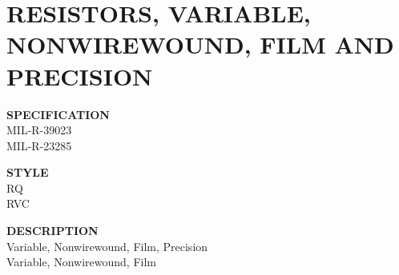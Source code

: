 \section{RESISTORS, VARIABLE, NONWIREWOUND, FILM AND PRECISION}

\begin{minipage}[t]{0.24\textwidth}
    \textbf{SPECIFICATION}\\
    MIL-R-39023\\MIL-R-23285
\end{minipage}
\hfill
\begin{minipage}[t]{0.12\textwidth}
    \textbf{STYLE}\\
    RQ\\RVC
\end{minipage}
\hfill
\begin{minipage}[t]{0.61\textwidth}
    \textbf{DESCRIPTION}\\
    Variable, Nonwirewound, Film, Precision\\Variable, Nonwirewound, Film
\end{minipage}

